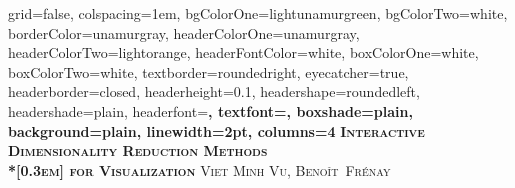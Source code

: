 \documentclass[portrait,final,a0paper]{nadiposter}
\begin{document}







\begin{poster}%
  {
  grid=false,
  colspacing=1em,
  bgColorOne=lightunamurgreen,
  bgColorTwo=white,
  borderColor=unamurgray,
  headerColorOne=unamurgray,
  headerColorTwo=lightorange,
  headerFontColor=white,
  boxColorOne=white,
  boxColorTwo=white,
  textborder=roundedright,
  eyecatcher=true,
  headerborder=closed,
  headerheight=0.1\textheight,
  headershape=roundedleft,
  headershade=plain,
  headerfont=\Large\bf\textsc, %
  textfont={\setlength{\parindent}{1.5em}},
  boxshade=plain,
  background=plain,
  linewidth=2pt,
  columns=4
  }
  {\hbox{} } %
  {\bf\textsc{Interactive Dimensionality Reduction Methods\\*[0.3em] for Visualization}\vspace{0.5em}}
  {\textsc{Viet Minh Vu, Beno\^it~Fr\'enay} } %
  {%
   \hbox{} %
  }



\sectionfont{\centering}

\end{poster}
\end{document}
